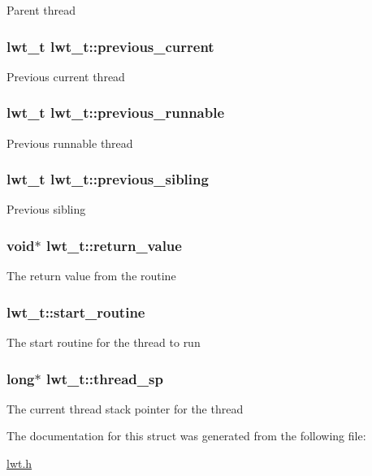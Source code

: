 Parent thread \hypertarget{structlwt_afe18cb4e9b5f4c60289674d2298993a2}{
\subsubsection[{previous\+\_\+current}]{\setlength{\rightskip}{0pt plus 5cm}lwt\+\_\+t lwt\+\_\+t\+::previous\+\_\+current}}\label{structlwt_afe18cb4e9b5f4c60289674d2298993a2}
Previous current thread \hypertarget{structlwt_acb89e009a8cb87cbd5d71ab5ca08911b}{
\subsubsection[{previous\+\_\+runnable}]{\setlength{\rightskip}{0pt plus 5cm}lwt\+\_\+t lwt\+\_\+t\+::previous\+\_\+runnable}}\label{structlwt_acb89e009a8cb87cbd5d71ab5ca08911b}
Previous runnable thread \hypertarget{structlwt_a28f05f6ebc974d92415a55b8e190670e}{
\subsubsection[{previous\+\_\+sibling}]{\setlength{\rightskip}{0pt plus 5cm}lwt\+\_\+t lwt\+\_\+t\+::previous\+\_\+sibling}}\label{structlwt_a28f05f6ebc974d92415a55b8e190670e}
Previous sibling \hypertarget{structlwt_a22ac5beef8503481294035218e73c3ef}{
\subsubsection[{return\+\_\+value}]{\setlength{\rightskip}{0pt plus 5cm}void$\ast$ lwt\+\_\+t\+::return\+\_\+value}}\label{structlwt_a22ac5beef8503481294035218e73c3ef}
The return value from the routine \hypertarget{structlwt_acdcfc344e943154b9d3d11e1a41cb9f1}{
\subsubsection[{start\+\_\+routine}]{ lwt\+\_\+t\+::start\+\_\+routine}}\label{structlwt_acdcfc344e943154b9d3d11e1a41cb9f1}
The start routine for the thread to run \hypertarget{structlwt_aba48cdf2f962d7ededf74923ddd33ea1}{
\subsubsection[{thread\+\_\+sp}]{\setlength{\rightskip}{0pt plus 5cm}long$\ast$ lwt\+\_\+t\+::thread\+\_\+sp}}\label{structlwt_aba48cdf2f962d7ededf74923ddd33ea1}
The current thread stack pointer for the thread 

The documentation for this struct was generated from the following file\+:\begin{DoxyCompactItemize}
\item 
\hyperlink{lwt_8h}{lwt.\+h}\end{DoxyCompactItemize}
